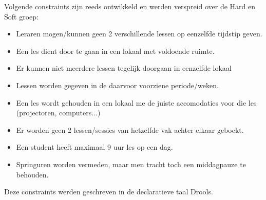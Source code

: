 Volgende constraints zijn reeds ontwikkeld en werden verspreid over de Hard en Soft groep:
\begin{itemize}
\item Leraren mogen/kunnen geen 2 verschillende lessen op eenzelfde tijdstip geven.
\item Een les dient door te gaan in een lokaal met voldoende ruimte.
\item Er kunnen niet meerdere lessen tegelijk doorgaan in eenzelfde lokaal
\item Lessen worden gegeven in de daarvoor voorziene periode/weken.
\item Een les wordt gehouden in een lokaal me de juiste accomodaties voor die les (projectoren, computers...)
\item Er worden geen 2 lessen/sessies van hetzelfde vak achter elkaar geboekt.
\item Een student heeft maximaal 9 uur les op een dag.
\item Springuren worden vermeden, maar men tracht toch een middagpauze te behouden.
\end{itemize}
Deze constraints werden geschreven in de declaratieve taal Drools\cite{Drools}.